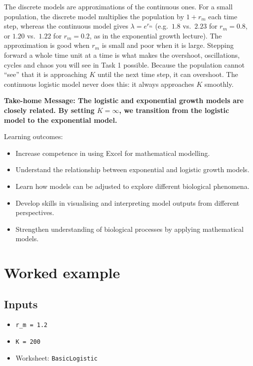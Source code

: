 \documentclass[
  a4paper]{book}
\providecommand{\tightlist}{%
  \setlength{\itemsep}{0pt}\setlength{\parskip}{0pt}}
\begin{document}
The discrete models are approximations of the continuous ones. For a small population, the discrete model multiplies the population by \(1 + r_m\) each time step, whereas the continuous model gives \(\lambda = e^{r_m}\) (e.g.~\(1.8\) vs.~\(2.23\) for \(r_m = 0.8\), or \(1.20\) vs.~\(1.22\) for \(r_m = 0.2\), as in the exponential growth lecture). The approximation is good when \(r_m\) is small and poor when it is large. Stepping forward a whole time unit at a time is what makes the overshoot, oscillations, cycles and chaos you will see in Task 1 possible. Because the population cannot ``see'' that it is approaching \(K\) until the next time step, it can overshoot. The continuous logistic model never does this: it always approaches \(K\) smoothly.

\textbf{Take-home Message: The logistic and exponential growth models are closely related. By setting \(K = \infty\), we transition from the logistic model to the exponential model.}

Learning outcomes:

\begin{itemize}
\tightlist
\item
  Increase competence in using Excel for mathematical modelling.
\item
  Understand the relationship between exponential and logistic growth models.
\item
  Learn how models can be adjusted to explore different biological phenomena.
\item
  Develop skills in visualising and interpreting model outputs from different perspectives.
\item
  Strengthen understanding of biological processes by applying mathematical models.
\end{itemize}

\section{Worked example}\label{worked-example-5}

\subsection{Inputs}\label{inputs-5}

\begin{itemize}
\tightlist
\item
  \texttt{r\_m\ =\ 1.2}
\item
  \texttt{K\ =\ 200}
\item
  Worksheet: \texttt{BasicLogistic}
\end{itemize}
\end{document}
